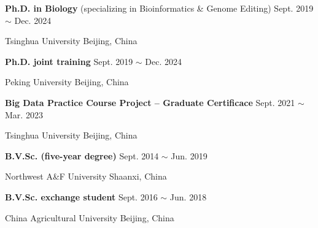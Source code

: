 

\renewcommand{\thefootnote}{\fnsymbol{footnote}}
\setcounter{footnote}{0}
    \textbf{Ph.D. in Biology} (specializing in Bioinformatics \& Genome Editing) \hfill Sept. 2019 $\sim$ Dec. 2024\footnotemark[1]

    Tsinghua University \hfill Beijing, China
    
    \textbf{Ph.D. joint training\footnotemark[2]} \hfill Sept. 2019 $\sim$ Dec. 2024\footnotemark[1]
    
    Peking University \hfill Beijing, China

    \textbf{Big Data Practice Course Project -- Graduate Certificace} \hfill Sept. 2021 $\sim$ Mar. 2023
    
    Tsinghua University \hfill Beijing, China

    \textbf{B.V.Sc. (five-year degree)} \hfill Sept. 2014 $\sim$ Jun. 2019
    
    Northwest A\&F University \hfill Shaanxi, China

    \textbf{B.V.Sc. exchange student} \hfill Sept. 2016 $\sim$ Jun. 2018
    
    China Agricultural University \hfill Beijing, China

\renewcommand{\thefootnote}{\arabic{footnote}}
\setcounter{footnote}{1}
